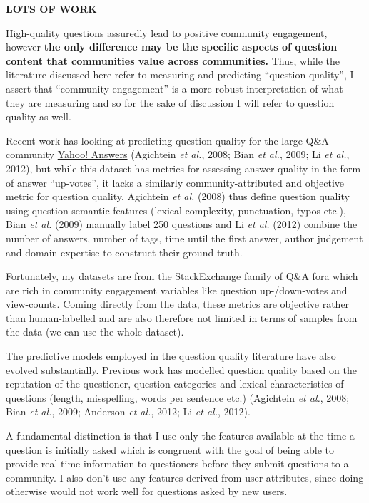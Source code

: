 \documentclass[11pt,preprint, authoryear]{article}
\numberwithin{equation}{section}
\begin{document}
\textbf{LOTS OF WORK}

High-quality questions assuredly lead to positive community engagement,
however \textbf{the only difference may be the specific aspects of
question content that communities value across communities.} Thus, while
the literature discussed here refer to measuring and predicting
``question quality'', I assert that ``community engagement'' is a more
robust interpretation of what they are measuring and so for the sake of
discussion I will refer to question quality as well.

Recent work has looking at predicting question quality for the large
Q\&A community \href{http://answers.yahoo.com}{Yahoo! Answers}
(Agichtein \emph{et al.}, 2008; Bian \emph{et al.}, 2009; Li \emph{et
al.}, 2012), but while this dataset has metrics for assessing answer
quality in the form of answer ``up-votes'', it lacks a similarly
community-attributed and objective metric for question quality.
Agichtein \emph{et al.} (2008) thus define question quality using
question semantic features (lexical complexity, punctuation, typos
etc.), Bian \emph{et al.} (2009) manually label 250 questions and Li
\emph{et al.} (2012) combine the number of answers, number of tags, time
until the first answer, author judgement and domain expertise to
construct their ground truth.

Fortunately, my datasets are from the StackExchange family of Q\&A fora
which are rich in community engagement variables like question
up-/down-votes and view-counts. Coming directly from the data, these
metrics are objective rather than human-labelled and are also therefore
not limited in terms of samples from the data (we can use the whole
dataset).

The predictive models employed in the question quality literature have
also evolved substantially. Previous work has modelled question quality
based on the reputation of the questioner, question categories and
lexical characteristics of questions (length, misspelling, words per
sentence etc.) (Agichtein \emph{et al.}, 2008; Bian \emph{et al.}, 2009;
Anderson \emph{et al.}, 2012; Li \emph{et al.}, 2012).

A fundamental distinction is that I use only the features available at
the time a question is initially asked which is congruent with the goal
of being able to provide real-time information to questioners before
they submit questions to a community. I also don't use any features
derived from user attributes, since doing otherwise would not work well
for questions asked by new users.
\end{document}
